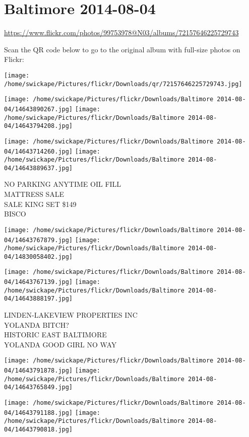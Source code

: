 \documentclass[10pt,letterpaper]{article}
\title{}
\author{}
\date{}
\begin{document}
\section*{Baltimore 2014-08-04}

\url{https://www.flickr.com/photos/99753978@N03/albums/72157646225729743}

Scan the QR code below to go to the original album with full-size photos on Flickr:

\texttt{[image: /home/swickape/Pictures/flickr/Downloads/qr/72157646225729743.jpg]}
\pagebreak

\texttt{[image: /home/swickape/Pictures/flickr/Downloads/Baltimore 2014-08-04/14643890267.jpg]}
\texttt{[image: /home/swickape/Pictures/flickr/Downloads/Baltimore 2014-08-04/14643794208.jpg]}

\texttt{[image: /home/swickape/Pictures/flickr/Downloads/Baltimore 2014-08-04/14643714260.jpg]}
\texttt{[image: /home/swickape/Pictures/flickr/Downloads/Baltimore 2014-08-04/14643889637.jpg]}

NO PARKING ANYTIME OIL FILL\\
MATTRESS SALE\\
SALE KING SET \$149\\
BISCO
\pagebreak

\texttt{[image: /home/swickape/Pictures/flickr/Downloads/Baltimore 2014-08-04/14643767879.jpg]}
\texttt{[image: /home/swickape/Pictures/flickr/Downloads/Baltimore 2014-08-04/14830058402.jpg]}

\texttt{[image: /home/swickape/Pictures/flickr/Downloads/Baltimore 2014-08-04/14643767139.jpg]}
\texttt{[image: /home/swickape/Pictures/flickr/Downloads/Baltimore 2014-08-04/14643888197.jpg]}

LINDEN{-}LAKEVIEW PROPERTIES INC\\
YOLANDA BITCH?\\
HISTORIC EAST BALTIMORE\\
YOLANDA GOOD GIRL NO WAY
\pagebreak

\texttt{[image: /home/swickape/Pictures/flickr/Downloads/Baltimore 2014-08-04/14643791878.jpg]}
\texttt{[image: /home/swickape/Pictures/flickr/Downloads/Baltimore 2014-08-04/14643765849.jpg]}

\texttt{[image: /home/swickape/Pictures/flickr/Downloads/Baltimore 2014-08-04/14643791188.jpg]}
\texttt{[image: /home/swickape/Pictures/flickr/Downloads/Baltimore 2014-08-04/14643790818.jpg]}
\end{document}
